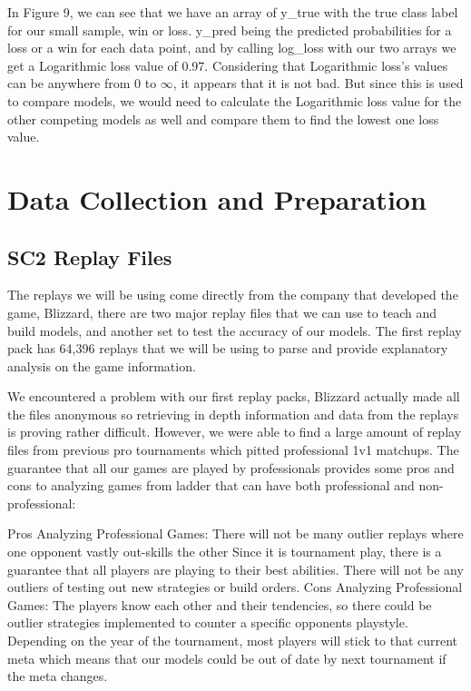 \documentclass[a4paper,12pt]{report}
\begin{document}

In Figure 9, we can see that we have an array of y\_true with the true class label for our small sample, win or loss. y\_pred being the predicted probabilities for a loss or a win for each data point, and by calling log\_loss with our two arrays we get a Logarithmic loss value of 0.97. Considering that Logarithmic loss’s values can be anywhere from 0 to $\infty$, it appears that it is not bad. But since this is used to compare models, we would need to calculate the Logarithmic loss value for the other competing models as well and compare them to find the lowest one loss value.

\section{Data Collection and Preparation}

\subsection{SC2 Replay Files}
The replays we will be using come directly from the company that developed the game, Blizzard, there are two major replay files that we can use to teach and build models, and another set to test the accuracy of our models. The first replay pack has 64,396 replays that we will be using to parse and provide explanatory analysis on the game information.

We encountered a problem with our first replay packs, Blizzard actually made all the files anonymous so retrieving in depth information and data from the replays is proving rather difficult. However, we were able to find a large amount of replay files from previous pro tournaments which pitted professional 1v1 matchups. The guarantee that all our games are played by professionals provides some pros and cons to analyzing games from ladder that can have both professional and non-professional:


Pros Analyzing Professional Games:
 There will not be many outlier replays where one opponent vastly out-skills the other
 Since it is tournament play, there is a guarantee that all players are playing to their best abilities. There will not be any outliers of testing out new strategies or build orders.
Cons Analyzing Professional Games:
The players know each other and their tendencies, so there could be outlier strategies implemented to counter a specific opponents playstyle.
 Depending on the year of the tournament, most players will stick to that current meta which means that our models could be out of date by next tournament if the meta changes.
\end{document}
